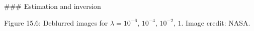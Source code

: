 

### Estimation and inversion

Figure 15.6: Deblurred images for \(\lambda=10^{-6}\), \(10^{-4}\), \(10^{-2}\), \(1\). Image credit: NASA.

